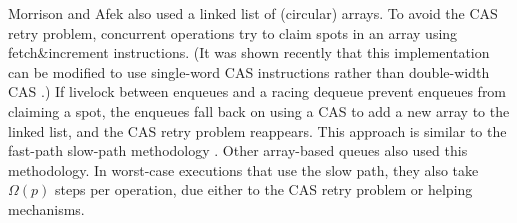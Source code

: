 Morrison and Afek \cite{DBLP:conf/ppopp/MorrisonA13} also used a linked list of (circular) arrays.
To avoid the CAS retry problem, concurrent operations try to claim spots in an array using fetch\&increment instructions.
(It was shown recently that this implementation can be modified to use single-word CAS instructions rather than double-width CAS \cite{RK23}.)
If livelock between enqueues and a racing dequeue prevent enqueues from claiming a spot,
the enqueues fall back on using a CAS to add a new array to the linked list, 
and the CAS retry problem reappears.
This approach is similar to the fast-path slow-path methodology \cite{10.1145/2370036.2145835}.
Other array-based queues \cite{Nik19,10.1145/3490148.3538572,DBLP:conf/ppopp/YangM16} also used this methodology.
In worst-case executions that use the slow path,
they also take $\Omega(p)$ steps per operation, 
due either to the CAS retry problem or helping mechanisms.





